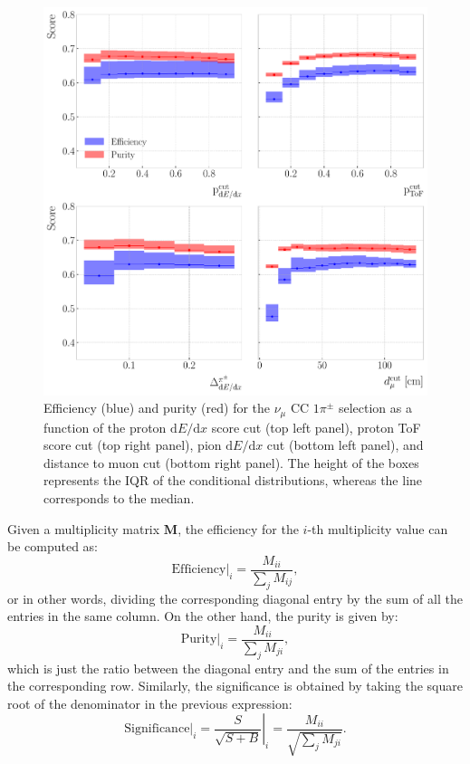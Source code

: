 \begin{figure}[t]
    \centering
    \includegraphics[width=.85\linewidth]{Images/GAr_selection/pion_selection_1_pions_metrics.pdf}
    \caption[Efficiency and purity for the $\nu_{\mu}$ CC $1\pi^{\pm}$ selection as a function of the different cuts.]{Efficiency (blue) and purity (red) for the $\nu_{\mu}$ CC $1\pi^{\pm}$ selection as a function of the proton $\mathrm{d}E/\mathrm{d}x$ score cut (top left panel), proton ToF score cut (top right panel), pion $\mathrm{d}E/\mathrm{d}x$ cut (bottom left panel), and distance to muon cut (bottom right panel). The height of the boxes represents the IQR of the conditional distributions, whereas the line corresponds to the median.}
    \label{fig:pion_selection_1_pions_metrics}
\end{figure}

Given a multiplicity matrix $\mathbf{M}$, the efficiency for the $i$-th multiplicity value can be computed as:
\begin{equation}\label{eq:efficiency_matrix}
    \left.\mathrm{Efficiency}\right|_{i} = \frac{M_{ii}}{\sum_{j} M_{ij}},
\end{equation}
or in other words, dividing the corresponding diagonal entry by the sum of all the entries in the same column. On the other hand, the purity is given by:
\begin{equation}\label{eq:purity_matrix}
    \left.\mathrm{Purity}\right|_{i} = \frac{M_{ii}}{\sum_{j} M_{ji}},
\end{equation}
which is just the ratio between the diagonal entry and the sum of the entries in the corresponding row. Similarly, the significance is obtained by taking the square root of the denominator in the previous expression:
\begin{equation}\label{eq:significance_matrix}
    \left.\mathrm{Significance}\right|_{i} = \left.\frac{S}{\sqrt{S+B}}\right|_{i} = \frac{M_{ii}}{\sqrt{\sum_{j} M_{ji}}}.
\end{equation}

